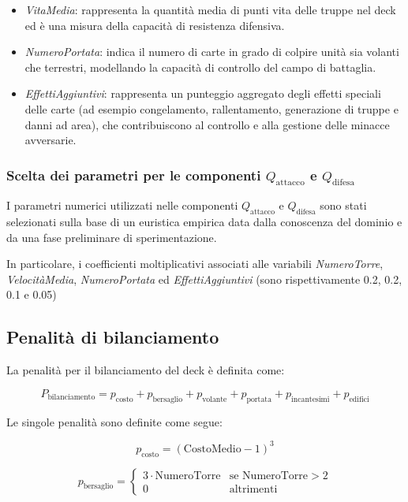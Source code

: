 \documentclass{article}
\begin{document}
\begin{itemize}
    \item \textit{VitaMedia}: rappresenta la quantità media di punti vita delle truppe nel deck ed è una misura della capacità di resistenza difensiva.
    \item \textit{NumeroPortata}: indica il numero di carte in grado di colpire unità sia volanti che terrestri, modellando la capacità di controllo del campo di battaglia.
    \item \textit{EffettiAggiuntivi}: rappresenta un punteggio aggregato degli effetti speciali delle carte (ad esempio congelamento, rallentamento, generazione di truppe e danni ad area), che contribuiscono al controllo e alla gestione delle minacce avversarie.
\end{itemize}

\subsubsection{Scelta dei parametri per le componenti $Q_{\text{attacco}}$ e $Q_{\text{difesa}}$}

I parametri numerici utilizzati nelle componenti $Q_{\text{attacco}}$ e $Q_{\text{difesa}}$ sono stati selezionati sulla base di un euristica empirica data dalla  conoscenza del dominio e da una fase preliminare di sperimentazione.

In particolare, i coefficienti moltiplicativi associati alle variabili \textit{NumeroTorre}, \textit{VelocitàMedia}, \textit{NumeroPortata} ed \textit{EffettiAggiuntivi} (sono rispettivamente 0.2, 0.2, 0.1 e 0.05) 

\subsection{Penalità di bilanciamento}

La penalità per il bilanciamento del deck è definita come:

\[
P_{\text{bilanciamento}} = p_{\text{costo}} + p_{\text{bersaglio}} + p_{\text{volante}} + p_{\text{portata}} + p_{\text{incantesimi}} + p_{\text{edifici}}
\]

Le singole penalità sono definite come segue:

\[
p_{\text{costo}} = (\text{CostoMedio} - 1)^3
\]

\[
p_{\text{bersaglio}} =
\begin{cases}
3 \cdot \text{NumeroTorre} & \text{se } \text{NumeroTorre} > 2 \\
0 & \text{altrimenti}
\end{cases}
\]
\end{document}
